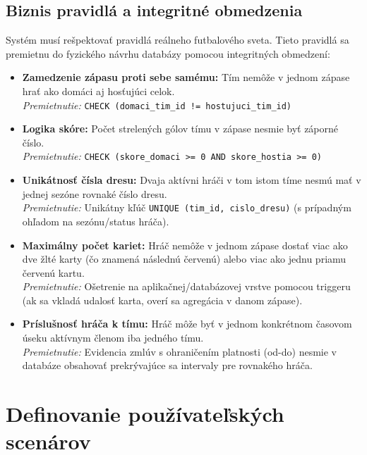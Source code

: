 \documentclass[11pt, a4paper]{article}
\begin{document}
\subsection{Biznis pravidlá a integritné obmedzenia}
Systém musí rešpektovať pravidlá reálneho futbalového sveta. Tieto pravidlá sa premietnu do fyzického návrhu databázy pomocou integritných obmedzení:
\begin{itemize}
    \item \textbf{Zamedzenie zápasu proti sebe samému:} Tím nemôže v jednom zápase hrať ako domáci aj hosťujúci celok. \\
    \textit{Premietnutie:} \texttt{CHECK (domaci\_tim\_id != hostujuci\_tim\_id)}
    \item \textbf{Logika skóre:} Počet strelených gólov tímu v zápase nesmie byť záporné číslo. \\
    \textit{Premietnutie:} \texttt{CHECK (skore\_domaci >= 0 AND skore\_hostia >= 0)}
    \item \textbf{Unikátnosť čísla dresu:} Dvaja aktívni hráči v tom istom tíme nesmú mať v jednej sezóne rovnaké číslo dresu. \\
    \textit{Premietnutie:} Unikátny kľúč \texttt{UNIQUE (tim\_id, cislo\_dresu)} (s prípadným ohľadom na sezónu/status hráča).
    \item \textbf{Maximálny počet kariet:} Hráč nemôže v jednom zápase dostať viac ako dve žlté karty (čo znamená následnú červenú) alebo viac ako jednu priamu červenú kartu. \\
    \textit{Premietnutie:} Ošetrenie na aplikačnej/databázovej vrstve pomocou triggeru (ak sa vkladá udalosť karta, overí sa agregácia v danom zápase).
    \item \textbf{Príslušnosť hráča k tímu:} Hráč môže byť v jednom konkrétnom časovom úseku aktívnym členom iba jedného tímu. \\
    \textit{Premietnutie:} Evidencia zmlúv s ohraničením platnosti (od-do) nesmie v databáze obsahovať prekrývajúce sa intervaly pre rovnakého hráča.
\end{itemize}

\newpage
\section{Definovanie používateľských scenárov}
\label{sec:scenare}
\end{document}
